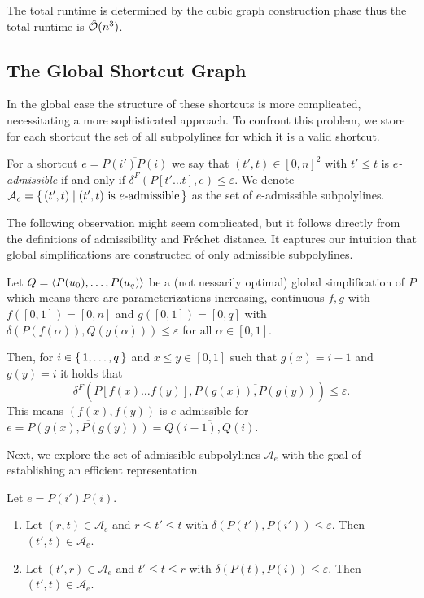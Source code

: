 The total runtime is determined by the cubic graph construction phase thus the total runtime is \(\hat{\mathcal{O}}(n^3)\).

\subsection{The Global Shortcut Graph}
In the global case the structure of these shortcuts is more complicated, necessitating a more sophisticated approach. To confront this problem, we store for each shortcut the set of all subpolylines for which it is a valid shortcut. 

\begin{definition}
  For a shortcut \(e = \overline{P(i')P(i)}\) we say that \((t', t) \in [0, n]^2\) with \(t' \leq t\) is \emph{\(e\)-admissible} if and only if \(\delta^F(P[t' \dots t], e) \leq \varepsilon\). We denote \(\mathcal{A}_e = \set{(t', t) \mid (t', t) \textrm{ is } e\textrm{-admissible}}\) as the set of \(e\)-admissible subpolylines.
\end{definition}

The following observation might seem complicated, but it follows directly from the definitions of admissibility and Fréchet distance. It captures our intuition that global simplifications are constructed of only admissible subpolylines.

\begin{observation}
	Let \(Q=\left\langle P(u_0), \dots, P(u_q)\right\rangle\) be a (not nessarily optimal) global simplification of \(P\) which means there are parameterizations increasing, continuous \(f, g\) with \(f([0, 1]) = [0, n]\) and \(g([0,1]) = [0, q]\) with \(\delta(P(f(\alpha)), Q(g(\alpha))) \leq \varepsilon\) for all \(\alpha \in [0, 1]\).

	Then, for \(i \in \set{1, \dots, q}\) and \(x \leq y \in [0, 1]\) such that \(g(x) = i - 1\) and \(g(y) = i\) it holds that 
	\[\delta^F(P[f(x) \dots f(y)], \overline{P(g(x)), P(g(y))}) \leq \varepsilon.\]
	This means \((f(x), f(y))\) is \(e\)-admissible for \(e = \overline{P(g(x), P(g(y)))} = \overline{Q(i-1), Q(i)}\).
\end{observation}

Next, we explore the set of admissible subpolylines \(\mathcal{A}_e\) with the goal of establishing an efficient representation.

\begin{lemma}\label{lem:admissible_are_intervals}
	Let \(e = \overline{P(i')P(i)}\).
  \begin{enumerate}
		\item Let \((r, t)\in \mathcal{A}_e\) and \(r \leq t' \leq t\) with \(\delta(P(t'), P(i')) \leq \varepsilon\). Then \((t', t) \in \mathcal{A}_e\).
		\item Let \((t', r)\in \mathcal{A}_e\) and \(t' \leq t \leq r\) with \(\delta(P(t), P(i)) \leq \varepsilon\). Then \((t', t) \in \mathcal{A}_e\).
  \end{enumerate}
\end{lemma}

